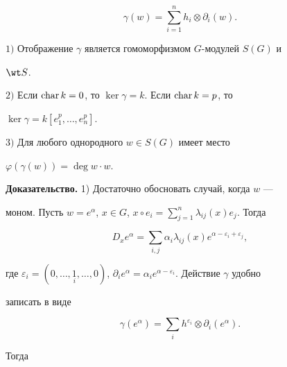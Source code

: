 $$ 


\gamma(w)=\sum^n_{i=1}h_i\otimes \partial_i(w). 


$$ 


 


\begin{lem} 


$1)$ Отображение $\gamma$ является гомоморфизмом $G$-модулей $S(G)$ и 


$\wt S$. 


 


$2)$ Если $\operatorname{char} k=0$, то $\ker\gamma=k$. Если $\operatorname{char} k=p$, то 


$\ker\gamma=k[e^p_1,\dotsc,e^p_n]$. 


 


$3)$ Для любого однородного $w\in S(G)$ имеет место 


$\varphi(\gamma(w))=\deg w\cdot w$. 


\end{lem} 


 


{\bf Доказательство.} 1) Достаточно обосновать случай, когда $w$ --- 


моном. Пусть $w=e^\alpha$, $x\in G$, $x\circ 


e_i=\sum\limits^n_{j=1}\lambda_{ij}(x)e_j$. Тогда 


$$ 


D_x e^\alpha=\sum_{i,j}\alpha_i \lambda_{ij}(x) 


e^{\alpha-\varepsilon_i+\varepsilon_j}, 


$$ 


где $\varepsilon_i=(0,\dotsc,\underset{i}{1}{},\dotsc,0)$, $\partial_i 


e^\alpha=\alpha_i e^{\alpha-\varepsilon_i}$. Действие $\gamma$ удобно 


записать в виде 


$$ 


\gamma(e^\alpha)=\sum_i h^{\varepsilon_i}\otimes\partial_i 


(e^\alpha). 


$$ 


Тогда 


